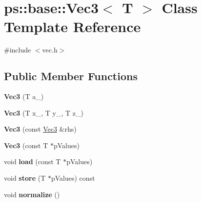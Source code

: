 \hypertarget{classps_1_1base_1_1Vec3}{}\section{ps\+:\+:base\+:\+:Vec3$<$ T $>$ Class Template Reference}
\label{classps_1_1base_1_1Vec3}


{\ttfamily \#include $<$vec.\+h$>$}

\subsection*{Public Member Functions}
\begin{DoxyCompactItemize}
\item 
\hypertarget{classps_1_1base_1_1Vec3_a23cb6d2a8d6a1b0ea236c6b602af38cd}{}{\bfseries Vec3} (T a\+\_\+)\label{classps_1_1base_1_1Vec3_a23cb6d2a8d6a1b0ea236c6b602af38cd}

\item 
\hypertarget{classps_1_1base_1_1Vec3_a67202f285a7a027f86a38e490fe45e42}{}{\bfseries Vec3} (T x\+\_\+, T y\+\_\+, T z\+\_\+)\label{classps_1_1base_1_1Vec3_a67202f285a7a027f86a38e490fe45e42}

\item 
\hypertarget{classps_1_1base_1_1Vec3_a8e5f0d4f6291bd7f988ed4e6a444c586}{}{\bfseries Vec3} (const \hyperlink{classps_1_1base_1_1Vec3}{Vec3} \&rhs)\label{classps_1_1base_1_1Vec3_a8e5f0d4f6291bd7f988ed4e6a444c586}

\item 
\hypertarget{classps_1_1base_1_1Vec3_af9717748ddb31c7e03ab706687c50fcc}{}{\bfseries Vec3} (const T $\ast$p\+Values)\label{classps_1_1base_1_1Vec3_af9717748ddb31c7e03ab706687c50fcc}

\item 
\hypertarget{classps_1_1base_1_1Vec3_a0554ed63c7a6b10a09b25b25e5f47f56}{}void {\bfseries load} (const T $\ast$p\+Values)\label{classps_1_1base_1_1Vec3_a0554ed63c7a6b10a09b25b25e5f47f56}

\item 
\hypertarget{classps_1_1base_1_1Vec3_a1eafa58ab73396dadf44987564c9ac8c}{}void {\bfseries store} (T $\ast$p\+Values) const \label{classps_1_1base_1_1Vec3_a1eafa58ab73396dadf44987564c9ac8c}

\item 
\hypertarget{classps_1_1base_1_1Vec3_ac58d99da87752686de63570447b7422d}{}void {\bfseries normalize} ()\label{classps_1_1base_1_1Vec3_ac58d99da87752686de63570447b7422d}


\end{DoxyCompactItemize}
